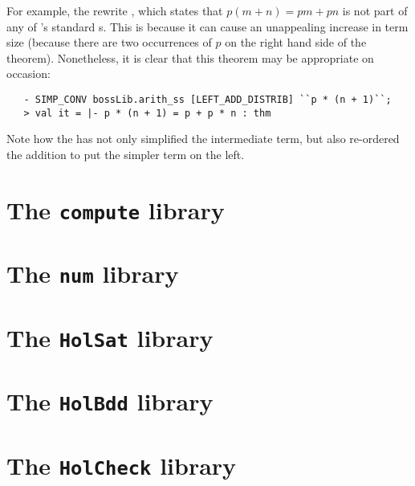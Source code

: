 For example, the rewrite , which
states that $p(m + n) = pm + pn$ is not part of any of \HOL's standard
\simpset{}s.  This is because it can cause an unappealing increase in
term size (because there are two occurrences of $p$ on the right hand
side of the theorem).  Nonetheless, it is clear that this theorem may
be appropriate on occasion:
\begin{session}
\begin{verbatim}
   - SIMP_CONV bossLib.arith_ss [LEFT_ADD_DISTRIB] ``p * (n + 1)``;
   > val it = |- p * (n + 1) = p + p * n : thm
\end{verbatim}
\end{session}
Note how the  \simpset{} has not only simplified the
intermediate  term, but also re-ordered the addition to
put the simpler term on the left.

\section{The \texttt{compute} library}
\label{sec:computeLib}

\section{The {\tt num} library}
\label{sec:numLib}

\section{The \texttt{HolSat} library}\label{sec:HolSatLib}
\section{The \texttt{HolBdd} library}\label{sec:HolBddLib}
\section{The \texttt{HolCheck} library}\label{sec:HolCheckLib}


